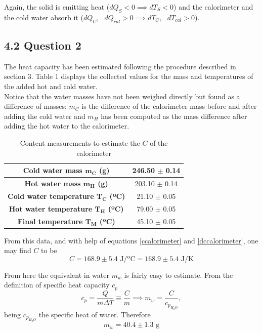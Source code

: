 \documentclass[a4paper, 12pt]{article}
\begin{document}
	Again, the solid is emitting heat ($dQ_{S} < 0 \implies dT_S < 0$) and the calorimeter and the cold water absorb it ($dQ_C, \mbox{ } dQ_{cal} > 0 \implies dT_C, \mbox{ } dT_{cal} > 0$).
	\subsection{4.2 Question 2}
	The heat capacity has been estimated following the procedure described in section 3. Table 1 displays the collected values for the mass and temperatures of the added hot and cold water. \\
	
	Notice that the water masses have not been weighed directly but found as a difference of masses: $m_C$ is the difference of the calorimeter mass before and after adding the cold water and $m_H$ has been computed as the mass difference after adding the hot water to the calorimeter.\\
	
	\begin{table}[h!]
		\centering
			\caption{Content measurements to estimate the $C$ of the calorimeter}
		\begin{tabular}{| c | c | }
			\hline
			\textbf{Cold water mass $\boldsymbol{m_C}$ (g)} & 246.50 $\pm$ 0.14 \\
			\hline	
			\textbf{Hot water mass $\boldsymbol{m_H}$ (g)} & 203.10 $\pm$ 0.14 \\
			\hline	
			\hline
			\textbf{Cold water temperature $\boldsymbol{T_C}$ (ºC)} & 21.10 $\pm$ 0.05 \\
			\hline	
			\textbf{Hot water temperature $\boldsymbol{T_H}$ (ºC)} & 79.00 $\pm$ 0.05 \\
			\hline	
			\textbf{Final temperature $\boldsymbol{T_M}$ (ºC)} & 45.10 $\pm$ 0.05 \\
			\hline	
		\end{tabular}

\end{table} 

	From this data, and with help of equations \ref{ccalorimeter} and \ref{dccalorimeter}, one may find $C$ to be
		\begin{equation*}\label{rccalorimeter}
			C = 168.9 \pm 5.4\mbox{ J/ºC} = 168.9 \pm 5.4\mbox{ J/K}
		\end{equation*}
	
	From here the equivalent in water $m_w$ is fairly easy to estimate. From the definition of specific heat capacity $c_p$
	\begin{equation}\label{meqwater}
		c_p = \frac{Q}{m\Delta T} \equiv \frac{C}{m} \implies m_w = \frac{C}{c_{p_{H_2O}}},
	\end{equation}
	being $c_{p_{H_2O}}$ the specific heat of water. Therefore
	\begin{equation*}\label{rmeq}
		m_w = 40.4 \pm 1.3 \mbox{ g}
	\end{equation*}
\end{document}
